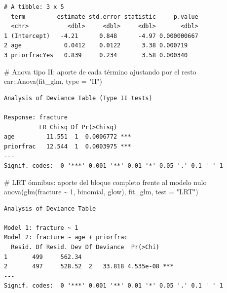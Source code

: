 \documentclass[
  letterpaper,
  DIV=11,
  numbers=noendperiod]{scrartcl}
\newenvironment{Shaded}{\begin{snugshade}}{\end{snugshade}}
\newcommand{\AttributeTok}[1]{\textcolor[rgb]{0.40,0.45,0.13}{#1}}
\newcommand{\CommentTok}[1]{\textcolor[rgb]{0.37,0.37,0.37}{#1}}
\newcommand{\DecValTok}[1]{\textcolor[rgb]{0.68,0.00,0.00}{#1}}
\newcommand{\FunctionTok}[1]{\textcolor[rgb]{0.28,0.35,0.67}{#1}}
\newcommand{\NormalTok}[1]{\textcolor[rgb]{0.00,0.23,0.31}{#1}}
\newcommand{\SpecialCharTok}[1]{\textcolor[rgb]{0.37,0.37,0.37}{#1}}
\newcommand{\StringTok}[1]{\textcolor[rgb]{0.13,0.47,0.30}{#1}}
\begin{document}
\begin{verbatim}
# A tibble: 3 x 5
  term         estimate std.error statistic     p.value
  <chr>           <dbl>     <dbl>     <dbl>       <dbl>
1 (Intercept)   -4.21      0.848      -4.97 0.000000667
2 age            0.0412    0.0122      3.38 0.000719   
3 priorfracYes   0.839     0.234       3.58 0.000340   
\end{verbatim}

\begin{Shaded}
\begin{Highlighting}[]
\CommentTok{\# Anova tipo II: aporte de cada término ajustando por el resto}
\NormalTok{car}\SpecialCharTok{::}\FunctionTok{Anova}\NormalTok{(fit\_glm, }\AttributeTok{type =} \StringTok{"II"}\NormalTok{)}
\end{Highlighting}
\end{Shaded}

\begin{verbatim}
Analysis of Deviance Table (Type II tests)

Response: fracture
          LR Chisq Df Pr(>Chisq)    
age         11.551  1  0.0006772 ***
priorfrac   12.544  1  0.0003975 ***
---
Signif. codes:  0 '***' 0.001 '**' 0.01 '*' 0.05 '.' 0.1 ' ' 1
\end{verbatim}

\begin{Shaded}
\begin{Highlighting}[]
\CommentTok{\# LRT ómnibus: aporte del bloque completo frente al modelo nulo}
\FunctionTok{anova}\NormalTok{(}\FunctionTok{glm}\NormalTok{(fracture }\SpecialCharTok{\textasciitilde{}} \DecValTok{1}\NormalTok{, binomial, glow), fit\_glm, }\AttributeTok{test =} \StringTok{"LRT"}\NormalTok{)}
\end{Highlighting}
\end{Shaded}

\begin{verbatim}
Analysis of Deviance Table

Model 1: fracture ~ 1
Model 2: fracture ~ age + priorfrac
  Resid. Df Resid. Dev Df Deviance  Pr(>Chi)    
1       499     562.34                          
2       497     528.52  2   33.818 4.535e-08 ***
---
Signif. codes:  0 '***' 0.001 '**' 0.01 '*' 0.05 '.' 0.1 ' ' 1
\end{verbatim}
\end{document}
